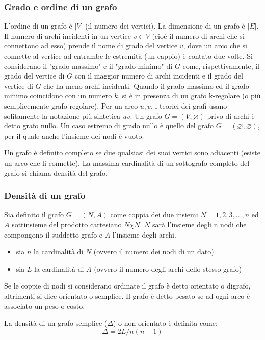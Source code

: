 \documentclass[11pt]{article}
\begin{document}
\subsubsection{Grado e ordine di un grafo}

L'ordine di un grafo \cite{GrafoOrdine} è $|V|$ (il numero dei vertici). La dimensione di un grafo è $|E|$. Il numero di archi incidenti in un vertice $v \in V$ (cioè il numero di archi che si connettono ad esso) prende il nome di grado del vertice $v$, dove un arco che si connette al vertice ad entrambe le estremità (un cappio) è contato due volte.
Si considerano il "grado massimo" e il "grado minimo" di $G$ come, rispettivamente, il grado del vertice di $G$ con il maggior numero di archi incidenti e il grado del vertice di $G$ che ha meno archi incidenti. Quando il grado massimo ed il grado minimo coincidono con un numero $k$, si è in presenza di un grafo k-regolare (o più semplicemente grafo regolare).
Per un arco ${u, v}$, i teorici dei grafi usano solitamente la notazione più sintetica $uv$.
Un grafo $G=(V,\varnothing)$ privo di archi è detto grafo nullo. Un caso estremo di grado nullo è quello del grafo $G=(\varnothing,\varnothing)$, per il quale anche l'insieme dei nodi è vuoto.

Un grafo è definito completo se due qualsiasi dei suoi vertici sono adiacenti (esiste un arco che li connette). La massima cardinalità di un sottografo completo del grafo si chiama densità del grafo.

\subsubsection{Densità di un grafo}

Sia definito il grafo $G=(N,A)$ come coppia dei due insiemi $N={1,2,3,...,n}$ ed $A$ sottinsieme del prodotto cartesiano $N \chi N$. $N$ sarà l'insieme degli n nodi che compongono il suddetto grafo e $A$ l'insieme degli archi.
\begin{itemize}
    \item sia $n$ la cardinalità di $N$ (ovvero il numero dei nodi di un dato)
    \item sia $L$ la cardinalità di $A$ (ovvero il numero degli archi dello stesso grafo)
\end{itemize}
Se le coppie di nodi si considerano ordinate il grafo è detto orientato o digrafo, altrimenti si dice orientato o semplice. Il grafo è detto pesato se ad ogni arco è associato un peso o costo.

La densità di un grafo semplice ($\Delta$) o non orientato è definita come:
\begin{equation}
    \Delta = 2L/n(n-1)
\end{equation}
\end{document}
